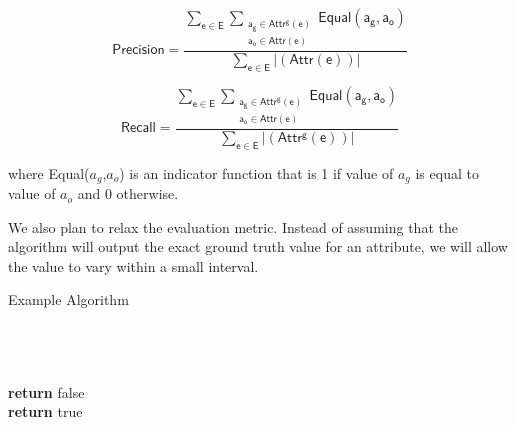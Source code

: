 \documentclass{acm_proc_article-sp}
\begin{document}
\begin{equation}
\mathsf {Precision =\frac {\sum_{e \in E}  \sum_{\substack{a_g \in Attr^g(e) \\ a_o \in Attr(e)}} Equal(a_g,a_o)}{\sum_{e \in E}  |(Attr(e))| }}
\end{equation}




 \begin{equation}
\mathsf {Recall =\frac {\sum_{e \in E}  \sum_{\substack{a_g \in Attr^g(e) \\ a_o \in Attr(e)}} Equal(a_g,a_o)} {\sum_{e \in E}  |(Attr^g(e))| }}
\end{equation}

where Equal($a_g$,$a_o$) is an indicator function that is 1 if value of $a_g$ is equal to value of $a_o$  and 0 otherwise.

We also plan to relax the evaluation metric. Instead of assuming that the algorithm will output the exact ground truth value for an attribute, we will allow the value to vary within a small interval. 


\begin{algorithm}[H]
\caption{Example Algorithm}
\begin{algorithmic}[1]
 \\
 \\
 \\


\State \textbf{return} false
\EndIf
\EndFor
\\

\State \textbf{return} true
\EndFunction
\end{algorithmic}
\end{algorithm}  



  

\balancecolumns
\end{document}
